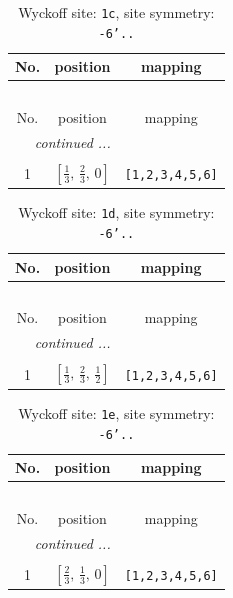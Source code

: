 \documentclass[fleqn,8pt]{jsarticle}
\begin{document}
\begin{longtable}{ccc}
\caption{Wyckoff site: {\tt 1c}, site symmetry: {\tt -6'..}}
 \\
 \hline \hline
No. & position & mapping \\ \hline \endfirsthead

\multicolumn{2}{l}{\tablename\ \thetable{}} \\
 \hline \hline
No. & position & mapping \\ \hline \endhead

 \hline \hline
\multicolumn{2}{r}{\footnotesize\it continued ...} \\ \endfoot

 \hline \hline
\multicolumn{2}{r}{} \\ \endlastfoot

1 & $\left[ \frac{1}{3},\, \frac{2}{3},\, 0 \right]$ & {\tt [1,2,3,4,5,6]} \\
\end{longtable}
\renewcommand{\arraystretch}{1.2}
\begin{longtable}{ccc}
\caption{Wyckoff site: {\tt 1d}, site symmetry: {\tt -6'..}}
 \\
 \hline \hline
No. & position & mapping \\ \hline \endfirsthead

\multicolumn{2}{l}{\tablename\ \thetable{}} \\
 \hline \hline
No. & position & mapping \\ \hline \endhead

 \hline \hline
\multicolumn{2}{r}{\footnotesize\it continued ...} \\ \endfoot

 \hline \hline
\multicolumn{2}{r}{} \\ \endlastfoot

1 & $\left[ \frac{1}{3},\, \frac{2}{3},\, \frac{1}{2} \right]$ & {\tt [1,2,3,4,5,6]} \\
\end{longtable}
\renewcommand{\arraystretch}{1.2}
\begin{longtable}{ccc}
\caption{Wyckoff site: {\tt 1e}, site symmetry: {\tt -6'..}}
 \\
 \hline \hline
No. & position & mapping \\ \hline \endfirsthead

\multicolumn{2}{l}{\tablename\ \thetable{}} \\
 \hline \hline
No. & position & mapping \\ \hline \endhead

 \hline \hline
\multicolumn{2}{r}{\footnotesize\it continued ...} \\ \endfoot

 \hline \hline
\multicolumn{2}{r}{} \\ \endlastfoot

1 & $\left[ \frac{2}{3},\, \frac{1}{3},\, 0 \right]$ & {\tt [1,2,3,4,5,6]} \\
\end{longtable}
\end{document}
